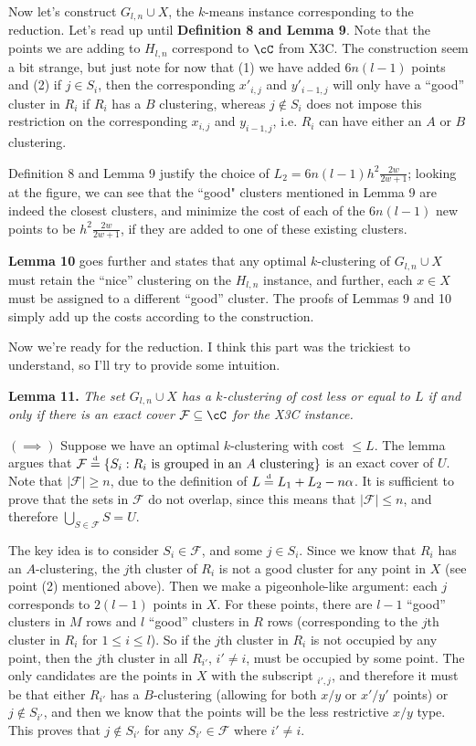 Now let's construct $G_{l,n}\cup X$, the $k$-means instance corresponding to the reduction. Let's read up until \textbf{Definition 8 and Lemma 9}. Note that the points we are adding to $H_{l,n}$ correspond to $\cC$ from X3C. The construction seem a bit strange, but just note for now that (1) we have added $6n(l-1)$ points and (2) if $j\in S_i$, then the corresponding $x'_{i,j}$ and $y'_{i-1,j}$ will only have a ``good'' cluster in $R_i$ if $R_i$ has a $B$ clustering, whereas $j\not\in S_i$ does not impose this restriction on the corresponding $x_{i,j}$ and $y_{i-1,j}$, i.e. $R_i$ can have either an $A$ or $B$ clustering.

Definition 8 and Lemma 9 justify the choice of $L_2=6n(l-1)h^2\frac{2w}{2w+1}$; looking at the figure, we can see that the ``good" clusters mentioned in Lemma 9 are indeed the closest clusters, and minimize the cost of each of the $6n(l-1)$ new points to be $h^2\frac{2w}{2w+1}$, if they are added to one of these existing clusters.

\textbf{Lemma 10} goes further and states that any optimal $k$-clustering of $G_{l,n}\cup X$ must retain the ``nice'' clustering on the $H_{l,n}$ instance, and further, each $x\in X$ must be assigned to a different ``good'' cluster. The proofs of Lemmas 9 and 10 simply add up the costs according to the construction.

Now we're ready for the reduction. I think this part was the trickiest to understand, so I'll try to provide some intuition.

\textbf{Lemma 11.} \textit{The set $G_{l,n}\cup X$ has a $k$-clustering of cost less or equal to $L$ if and only if there is an exact cover $\mathcal{F}\subseteq \cC$ for the X3C instance.}

$(\implies)$ Suppose we have an optimal $k$-clustering with cost $\le L$. The
lemma argues that $\mathcal{F} \overset{\text{\tiny d}}{=} \{S_i:R_i\text{ is grouped in an $A$ clustering}\}$
is an exact cover of $U$. Note that $|\mathcal{F}|\ge n$, due to the definition
of $L \overset{\text{\tiny d}}{=} L_1+L_2-n\alpha$. It is sufficient to prove that the sets in
$\mathcal{F}$ do not overlap, since this means that $|\mathcal{F}|\le n$,
and therefore $\bigcup_{S\in\mathcal{F}}S=U$. 

The key idea is to consider $S_i\in\mathcal{F}$, and some $j\in S_i$. Since we know that $R_i$ has an $A$-clustering, the $j$th cluster of $R_i$ is not a good cluster for any point in $X$ (see point (2) mentioned above). Then we make a pigeonhole-like argument: each $j$ corresponds to $2(l-1)$ points in $X$. For these points, there are $l-1$ ``good'' clusters in $M$ rows and $l$ ``good'' clusters in $R$ rows (corresponding to the $j$th cluster in $R_i$ for $1\le i\le l$). So if the $j$th cluster in $R_i$ is not occupied by any point, then the $j$th cluster in all $R_{i'}$, $i'\ne i$, must be occupied by some point. The only candidates are the points in $X$ with the subscript $_{i',j}$, and therefore it must be that either $R_{i'}$ has a $B$-clustering (allowing for both $x/y$ or $x'/y'$ points) or $j\not\in S_{i'}$, and then we know that the points will be the less restrictive $x/y$ type. This proves that $j\not\in S_{i'}$ for any $S_{i'}\in\mathcal{F}$ where $i'\ne i$.

